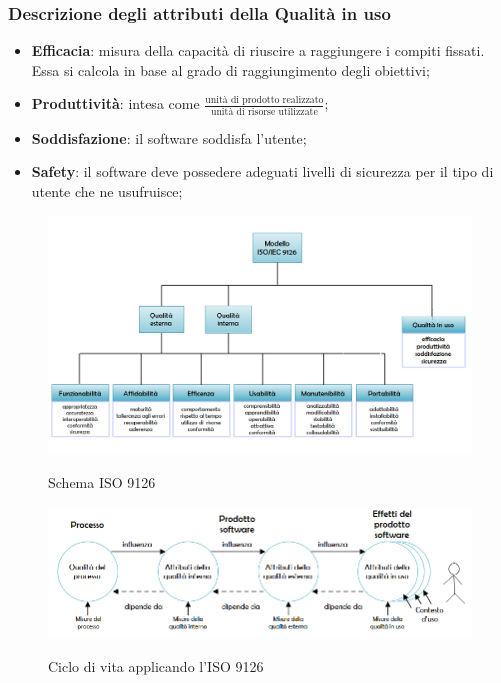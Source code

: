 		\subsubsection{Descrizione degli attributi della Qualità in uso}
		\begin{itemize}
			\item \textbf{Efficacia}: misura della capacità di riuscire a raggiungere i compiti fissati. Essa si calcola
			in base al grado di raggiungimento degli obiettivi;
			\item \textbf{Produttività}: intesa come $ \frac{\text{unità di prodotto realizzato}}{\text{unità di risorse utilizzate}} $;
			\item \textbf{Soddisfazione}: il software soddisfa l'utente;
			\item \textbf{Safety}: il software deve possedere adeguati livelli di sicurezza per il tipo di utente che ne usufruisce;
		\end{itemize}
	
	\begin{figure}[H]
		\includegraphics[width=\textwidth]{img/ISO9126.png}
		\label{fig:iso9126}
		\caption[Schema ISO 9126]{Schema ISO 9126 \protect\footnotemark}
	\end{figure}

	
	\begin{figure}[H]
		\includegraphics[width=\textwidth]{img/Ciclo_di_vita_9126.png}
		\label{fig:ciclo_di_vita}
		\caption[Ciclo di vita con l'ISO 9126]{Ciclo di vita applicando l'ISO 9126 \protect\footnotemark[1]}
	\end{figure}

